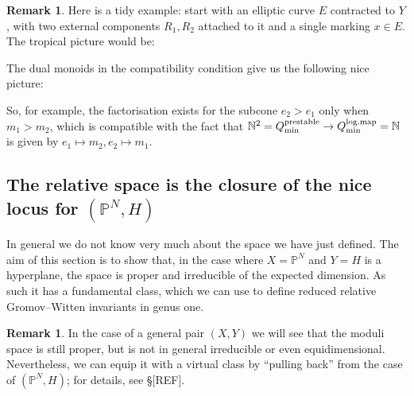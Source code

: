 \documentclass[11pt]{amsart}
\newcommand{\PP}{\mathbb P}
\renewcommand{\to}{\rightarrow}
\theoremstyle{definition}
\theoremstyle{definition}
\newtheorem{remark}[thm]{Remark}
\begin{document}
\begin{remark}
 Here is a tidy example: start with an elliptic curve $E$ contracted to $Y$, with two external components $R_1, R_2$ attached to it and a single marking $x\in E$. The tropical picture would be:
\begin{center}
\end{center}
The dual monoids in the compatibility condition give us the following nice picture:
\begin{center}
\end{center}
So, for example, the factorisation exists for the subcone $e_2>e_1$ only when $m_1>m_2$, which is compatible with the fact that $\mathbb N^2=Q_{\rm{min}}^{\rm{prestable}}\to Q_{\rm{min}}^{\rm{log.map}}=\mathbb N$ is given by
$e_1\mapsto m_2, e_2\mapsto m_1$.
\end{remark}

\subsection{The relative space is the closure of the nice locus for $(\PP^N,H)$}
\noindent In general we do not know very much about the space we have just defined. The aim of this section is to show that, in the case where $X=\PP^N$ and $Y=H$ is a hyperplane, the space is proper and irreducible of the expected dimension. As such it has a fundamental class, which we can use to define reduced relative Gromov--Witten invariants in genus one.

\begin{remark} In the case of a general pair $(X,Y)$ we will see that the moduli space is still proper, but is not in general irreducible or even equidimensional. Nevertheless, we can equip it with a virtual class by ``pulling back'' from the case of $(\PP^N,H)$; for details, see \S [REF]. \end{remark}
\end{document}

